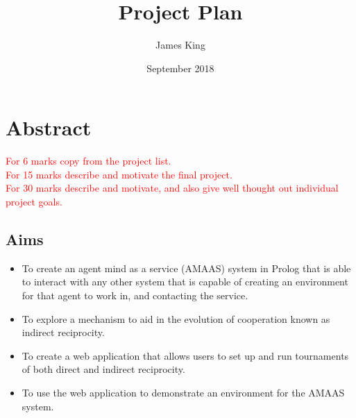 \documentclass{article}
\title{Project Plan}
\author{James King}
\date{September 2018}
\begin{document}
\maketitle

\section*{Abstract}

\textcolor{red}{For 6 marks copy from the project list.\\For 15 marks describe and motivate the final project.\\For 30 marks describe and motivate, and also give well thought out individual project goals.}

\subsection*{Aims}
\begin{itemize}
\item To create an agent mind as a service (AMAAS) system in Prolog that is able to interact with any other system that is capable of creating an environment for that agent to work in, and contacting the service.
\item To explore a mechanism to aid in the evolution of cooperation known as indirect reciprocity.
\item To create a web application that allows users to set up and run tournaments of both direct and indirect reciprocity.
\item To use the web application to demonstrate an environment for the AMAAS system.
\end{itemize}
\end{document}
